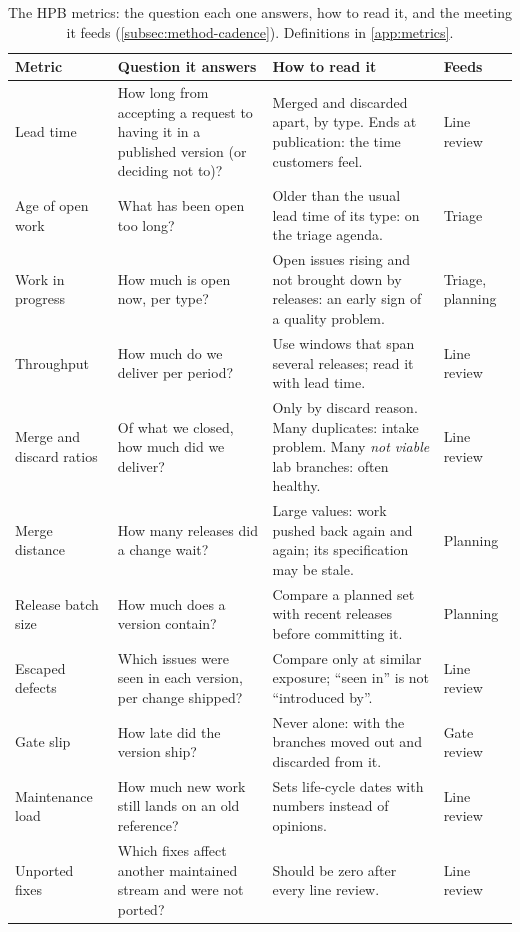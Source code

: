 \begin{table}[tbp]
  \centering
  \small
  \caption{The HPB metrics: the question each one answers, how to read it,
    and the meeting it feeds (\cref{subsec:method-cadence}). Definitions in
    \cref{app:metrics}.}
  \label{tab:metrics}
  \renewcommand{\arraystretch}{1.1}
  \begin{tabularx}{\linewidth}{@{}>{\raggedright\arraybackslash}p{2.3cm}
      >{\raggedright\arraybackslash}X
      >{\raggedright\arraybackslash}X
      >{\raggedright\arraybackslash}p{1.9cm}@{}}
    \toprule
    \textbf{Metric} & \textbf{Question it answers} & \textbf{How to read it}
      & \textbf{Feeds} \\
    \midrule
    Lead time
      & How long from accepting a request to having it in a published
        version (or deciding not to)?
      & Merged and discarded apart, by type. Ends at publication: the
        time customers feel.
      & Line review \\
    Age of open work
      & What has been open too long?
      & Older than the usual lead time of its type: on the triage agenda.
      & Triage \\
    Work in progress
      & How much is open now, per type?
      & Open issues rising and not brought down by releases: an early sign
        of a quality problem.
      & Triage, planning \\
    Throughput
      & How much do we deliver per period?
      & Use windows that span several releases; read it with lead time.
      & Line review \\
    Merge and discard ratios
      & Of what we closed, how much did we deliver?
      & Only by discard reason. Many duplicates: intake problem. Many
        \emph{not viable} lab branches: often healthy.
      & Line review \\
    Merge distance
      & How many releases did a change wait?
      & Large values: work pushed back again and again; its specification
        may be stale.
      & Planning \\
    Release batch size
      & How much does a version contain?
      & Compare a planned set with recent releases before committing it.
      & Planning \\
    Escaped defects
      & Which issues were seen in each version, per change shipped?
      & Compare only at similar exposure; ``seen in'' is not ``introduced
        by''.
      & Line review \\
    Gate slip
      & How late did the version ship?
      & Never alone: with the branches moved out and discarded from it.
      & Gate review \\
    Maintenance load
      & How much new work still lands on an old reference?
      & Sets life-cycle dates with numbers instead of opinions.
      & Line review \\
    Unported fixes
      & Which fixes affect another maintained stream and were not ported?
      & Should be zero after every line review.
      & Line review \\
    \bottomrule
  \end{tabularx}
\end{table}

